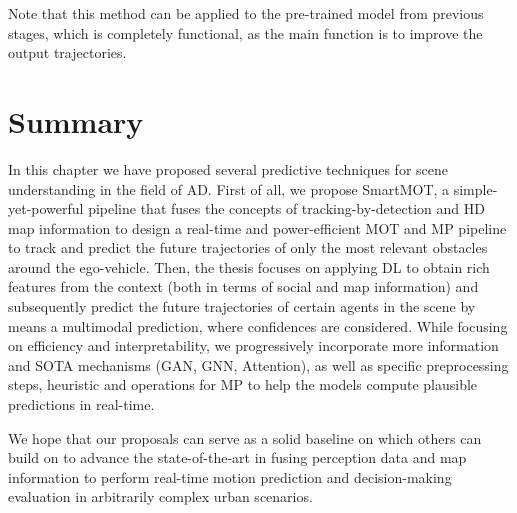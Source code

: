 Note that this method can be applied to the pre-trained model from previous stages, which is completely functional, as the main function is to improve the output trajectories.

\section{Summary}

In this chapter we have proposed several predictive techniques for scene understanding in the field of \ac{AD}. First of all, we propose SmartMOT, a simple-yet-powerful pipeline that fuses the concepts of tracking-by-detection and HD map information to design a real-time and power-efficient \ac{MOT} and \ac{MP} pipeline to track and predict the future trajectories of only the most relevant obstacles around the ego-vehicle. Then, the thesis focuses on applying \ac{DL} to obtain rich features from the context (both in terms of social and map information) and subsequently predict the future trajectories of certain agents in the scene by means a multimodal prediction, where confidences are considered. While focusing on efficiency and interpretability, we progressively incorporate more information and \ac{SOTA} mechanisms (\ac{GAN}, \ac{GNN}, Attention), as well as specific preprocessing steps, heuristic and operations for \ac{MP} to help the models compute plausible predictions in real-time.

We hope that our proposals can serve as a solid baseline on which others can build on to advance the state-of-the-art in fusing perception data and map information to perform real-time motion prediction and decision-making evaluation in arbitrarily complex urban scenarios. 

